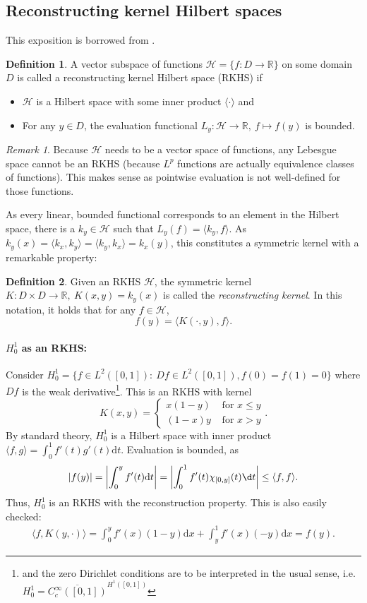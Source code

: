 \documentclass{scrartcl}
\theoremstyle{definition}
\newtheorem{definition}{Definition}
\theoremstyle{remark}
\newtheorem{remark}{Remark}
\newcommand{\de}{\mathrm d}
\newcommand{\R}{\mathbb R}
\DeclareRobustCommand{\mybox}[2][gray!20]{%
\begin{tcolorbox}[   %
        breakable,
        left=0pt,
        right=0pt,
        top=0pt,
        bottom=0pt,
        colback=#1,
        colframe=#1,
        width=\dimexpr\textwidth\relax, 
        enlarge left by=0mm,
        boxsep=5pt,
        arc=0pt,outer arc=0pt,
        ]
        #2
\end{tcolorbox}
}
\begin{document}
\mybox{\subsection*{Reconstructing kernel Hilbert spaces}
This exposition is borrowed from \cite{paulsen2016introduction}. 
\begin{definition}
A vector subspace of functions $\mathcal H = \{f:D\to \R\}$  on some domain $D$ is called a reconstructing kernel Hilbert space (RKHS) if
\begin{itemize}
\item $\mathcal H$ is a Hilbert space with some inner product $\langle\cdot\rangle$ and
\item For any $y\in D$, the evaluation functional $L_y: \mathcal H \to \R,~ f\mapsto f(y)$ is bounded.
\end{itemize}
\end{definition}
\begin{remark}
Because $\mathcal H$ needs to be a vector space of functions, any Lebesgue space cannot be an RKHS (because $L^p$ functions are actually equivalence classes of functions). This makes sense as pointwise evaluation is not well-defined for those functions.
\end{remark}
As every linear, bounded functional corresponds to an element in the Hilbert space, there is a $k_y\in \mathcal H$ such that $L_y(f) = \langle k_y, f\rangle$. As $k_y(x) = \langle k_x, k_y\rangle = \langle k_y, k_x\rangle = k_x(y)$, this constitutes a  symmetric kernel with a remarkable property:
\begin{definition}
Given an RKHS $\mathcal H$, the symmetric kernel $K:D\times D\to\R,~ K(x,y) = k_y(x)$ is called the \textit{reconstructing kernel}. In this notation, it holds that for any $f\in \mathcal H$,
\[ f(y) = \langle K(\cdot, y), f\rangle. \]
\end{definition}
\paragraph{$H_0^1$ as an RKHS:}
Consider $H_0^1 = \{f\in L^2([0,1]): ~ Df\in L^2([0,1]), f(0)=f(1)=0\}$ where $Df$ is the weak derivative\footnote{and the zero Dirichlet conditions are to be interpreted in the usual sense, i.e. $H_0^1=\overline{C_c^\infty( [0,1])}^{H^1([0,1])}$ }. This is an RKHS with kernel 
\[K(x,y) = \begin{cases}x(1-y) & \text{ for } x\leq y\\(1-x)y & \text{ for } x > y\end{cases}.\]
By standard theory, $H_0^1$ is a Hilbert space with inner product $\langle f, g\rangle = \int_0^1 f'(t)g'(t)\de t$. Evaluation is bounded, as
\begin{align*}
|f(y)| = \left|\int_0^y f'(t) \de t\right| = \left|\int_0^1 f'(t) \chi_{[0,y]}(t)\d t\right| \leq \langle f,f\rangle.
\end{align*}
Thus, $H_0^1$ is an RKHS with the reconstruction property. This is also easily checked:
\begin{align*}
\langle f, K(y, \cdot)\rangle = \int_0^y f'(x) (1-y)\de x + \int_y^1 f'(x) (-y)\de x = f(y).
\end{align*}
}
\end{document}
